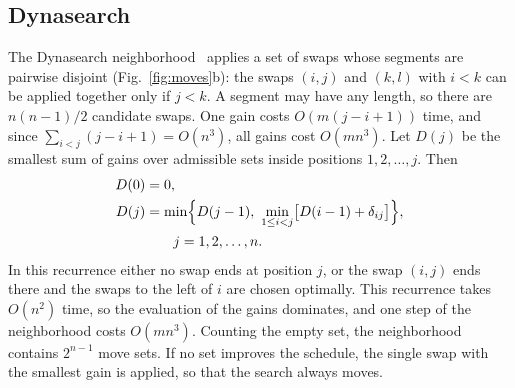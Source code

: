 \documentclass[10pt,twoside,twocolumn,a4paper]{article}
\newif\ifrevmarks \revmarksfalse
\newcommand{\rev}[1]{\ifrevmarks\textcolor{red}{#1}\else#1\fi}
\newenvironment{revblock}{\ifrevmarks\color{red}\fi}{}
\begin{document}
\subsection{\rev{Dynasearch}}
\begin{revblock}
The Dynasearch neighborhood~\cite{Congram2002} applies a set of swaps whose segments are pairwise disjoint (Fig.~\ref{fig:moves}b): the swaps $(i,j)$ and $(k,l)$ with $i<k$ can be applied together only if $j<k$. A segment may have any length, so there are $n(n-1)/2$ candidate swaps. One gain costs $O(m(j-i+1))$ time, and since $\sum_{i<j}(j-i+1)=O(n^3)$, all gains cost $O(mn^3)$. Let $D(j)$ be the smallest sum of gains over admissible sets inside positions $1,2,\dots,j$. Then
\begin{equation}
\begin{aligned}
D(0)&=0,\\
D(j)&=\min\Bigl\{D(j-1),\ \min_{1\le i<j}\bigl[D(i-1)+\delta_{ij}\bigr]\Bigr\},\\
&\qquad j=1,2,\dots,n.
\end{aligned}\label{eq:dyna}
\end{equation}
In this recurrence either no swap ends at position $j$, or the swap $(i,j)$ ends there and the swaps to the left of $i$ are chosen optimally. This recurrence takes $O(n^2)$ time, so the evaluation of the gains dominates, and one step of the neighborhood costs $O(mn^3)$. Counting the empty set, the neighborhood contains $2^{n-1}$ move sets. If no set improves the schedule, the single swap with the smallest gain is applied, so that the search always moves.
\end{revblock}
\end{document}
